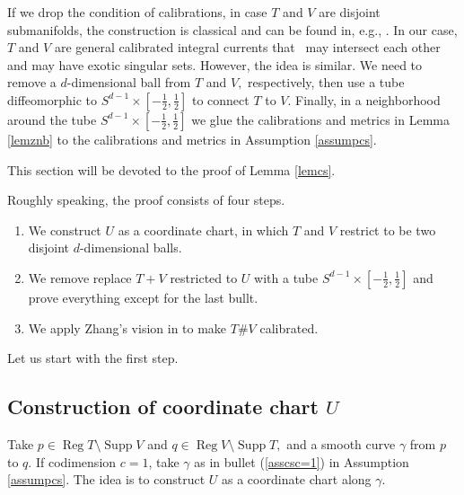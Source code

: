 \documentclass[11pt,a4paper]{amsart}
\numberwithin{equation}{section}
\newcommand{\supp}{\operatorname{Supp}}
\newcommand{\reg}{{\operatorname{Reg}}}
\newcommand{\ga}{\gamma}
\theoremstyle{plain}
\theoremstyle{definition}
\numberwithin{equation}{subsection}
\begin{document}
	If we drop the condition of calibrations, in case $T$ and $V$ are disjoint submanifolds, the construction is classical and can be found in, e.g., \cite{CL}. 	In our case, $T$ and $V$ are general calibrated integral currents that  may intersect each other and may have exotic singular sets. However, the idea is similar. We need to remove a $d$-dimensional ball from $T$ and $V,$ respectively, then use a tube diffeomorphic to $S^{d-1}\times[-\frac{1}{2},\frac{1}{2}]$ to connect $T$ to $V.$ Finally, in a neighborhood around the tube $S^{d-1}\times[-\frac{1}{2},\frac{1}{2}]$ we glue the calibrations and metrics in Lemma \ref{lemznb} to the calibrations and metrics in Assumption \ref{assumpcs}.
	
	This section will be devoted to the proof of Lemma \ref{lemcs}.
	
	Roughly speaking, the proof consists of four steps.
	\begin{enumerate}
		\item We construct $U$ as a coordinate chart, in which $T$ and $V$ restrict to be two disjoint $d$-dimensional balls.
		\item We remove replace $T+V$ restricted to $U$ with a tube $S^{d-1}\times[-\frac{1}{2},\frac{1}{2}]$ and prove everything except for the last bullt.
		\item We apply Zhang's vision in \cite{YZa,YZj} to make $T\# V$ calibrated.
	\end{enumerate}
	Let us start with the first step.
	\subsection{Construction of coordinate chart $U$}\label{seccht}
	Take $p\in \reg T\setminus \supp V$ and $q\in \reg V\setminus\supp T,$ and a smooth curve $\ga$ from $p$ to $q$. If codimension $c=1$, take $\ga$ as in bullet (\ref{asscsc=1}) in Assumption \ref{assumpcs}. The idea is to construct $U$ as a coordinate chart along $\ga$.
	
\end{document}
